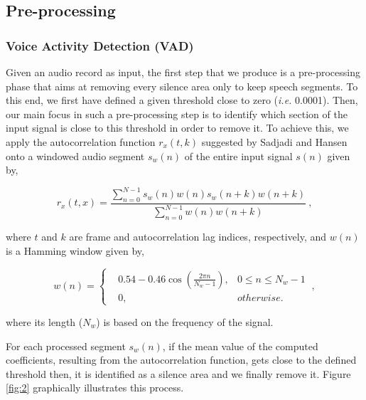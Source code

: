 \documentclass[cryptography,article,submit,moreauthors,pdftex,10pt,a4paper]{mdpi}
\begin{document}
\subsection{Pre-processing}

\subsubsection{Voice Activity Detection (VAD)}

Given an audio record as input, the first step that we produce is a pre-processing phase that aims at removing every silence area only to keep speech segments. To this end, we first have defined a given threshold close to zero (\textit{i.e.} 0.0001). Then, our main focus in such a pre-processing step is to identify which section of the input signal is close to this threshold in order to remove it. To achieve this, we apply the autocorrelation function $r_x (t,k)$ suggested by Sadjadi and Hansen \cite{27} onto a windowed audio segment $s_w (n)$ of the entire input signal $s(n)$ given by, 

\begin{equation}
\label{eq:1}
  r_x(t, x) = \frac{\sum\limits_{n=0}^{N-1}s_w(n)w(n)s_w(n+k)w(n+k)}{\sum\limits_{n=0}^{N-1}					   w(n)w(n+k)}~,
\end{equation}

\noindent where $t$ and $k$ are frame and autocorrelation lag indices, respectively, and $w(n)$ is a Hamming window given by,

\begin{equation}
\label{eq:2}
w(n) = \left\{
		\begin{array}{lll}
			&0.54-0.46 \cos(\frac{2\pi n}{N_w-1}), &0\leq n \leq N_w-1\\
			&0, &otherwise.
		\end{array}\right.~,
\end{equation}

\noindent where its length ($N_w$) is based on the frequency of the signal.

For each processed segment $s_w (n)$, if the mean value of the computed coefficients, resulting from the autocorrelation function, gets close to the defined threshold then, it is identified as a silence area and we finally remove it. Figure \ref{fig:2} graphically illustrates this process.
\end{document}

